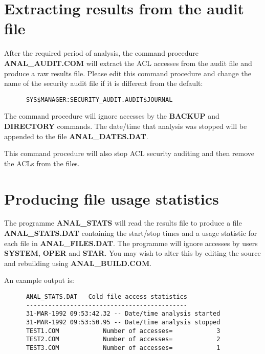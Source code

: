 \section{Extracting results from the audit file}

After the required period of analysis, the command procedure {\bf
ANAL\_AUDIT.COM} will extract the ACL accesses from the audit file and produce
a raw results file. Please edit this command procedure  and change the name of
the security audit file if it is different from the default:

\begin{verbatim}
      SYS$MANAGER:SECURITY_AUDIT.AUDIT$JOURNAL
\end{verbatim}

The command procedure will ignore accesses by the {\bf BACKUP} and {\bf
DIRECTORY} commands. The date/time that analysis was stopped will be appended
to the file {\bf ANAL\_DATES.DAT}.

This command procedure will also stop ACL security auditing and then remove the
ACLs from the files.

\section{Producing file usage statistics}

The programme {\bf ANAL\_STATS} will read the results file to produce a file
{\bf ANAL\_STATS\-.DAT} containing the start/stop times and a usage statistic
for each file in {\bf ANAL\_FILES\-.DAT}. The programme will ignore accesses by
users {\bf SYSTEM}, {\bf OPER} and {\bf STAR}. You may wish to alter this by
editing the source and rebuilding using {\bf ANAL\_BUILD.COM}.

An example output is:
\begin{verbatim}
      ANAL_STATS.DAT   Cold file access statistics
      --------------------------------------------
      31-MAR-1992 09:53:42.32 -- Date/time analysis started       
      31-MAR-1992 09:53:50.95 -- Date/time analysis stopped       
      TEST1.COM            Number of accesses=            3
      TEST2.COM            Number of accesses=            2
      TEST3.COM            Number of accesses=            1
\end{verbatim}
    

